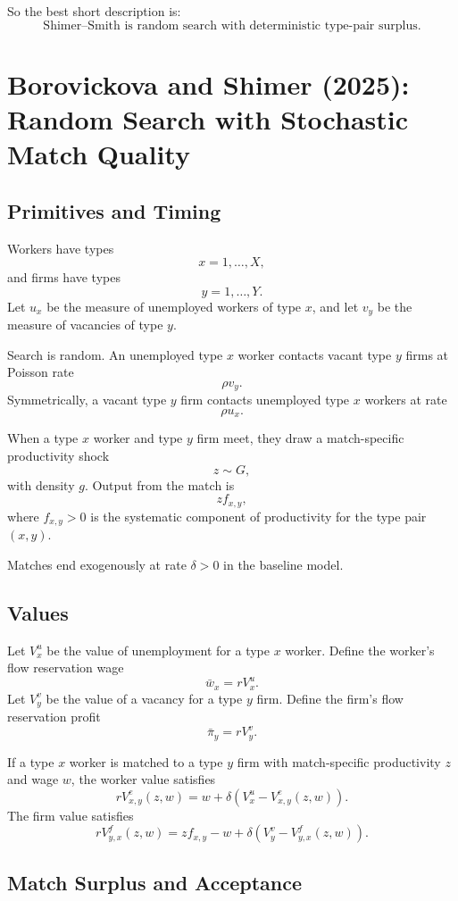 \documentclass[11pt]{article}
\newcommand{\1}{\mathbf{1}}
\begin{document}
So the best short description is:
\[
\boxed{\text{Shimer--Smith is random search with deterministic type-pair surplus.}}
\]

\section{Borovickova and Shimer (2025): Random Search with Stochastic Match Quality}

\subsection{Primitives and Timing}

Workers have types
\[
x=1,\ldots,X,
\]
and firms have types
\[
y=1,\ldots,Y.
\]
Let $u_x$ be the measure of unemployed workers of type $x$, and let $v_y$ be the measure of vacancies of type $y$.

Search is random. An unemployed type $x$ worker contacts vacant type $y$ firms at Poisson rate
\[
\rho v_y.
\]
Symmetrically, a vacant type $y$ firm contacts unemployed type $x$ workers at rate
\[
\rho u_x.
\]

When a type $x$ worker and type $y$ firm meet, they draw a match-specific productivity shock
\[
z \sim G,
\]
with density $g$. Output from the match is
\[
z f_{x,y},
\]
where $f_{x,y}>0$ is the systematic component of productivity for the type pair $(x,y)$.

Matches end exogenously at rate $\delta>0$ in the baseline model.

\subsection{Values}

Let $V_x^u$ be the value of unemployment for a type $x$ worker. Define the worker's flow reservation wage
\[
\bar w_x = rV_x^u.
\]
Let $V_y^v$ be the value of a vacancy for a type $y$ firm. Define the firm's flow reservation profit
\[
\bar \pi_y = rV_y^v.
\]

If a type $x$ worker is matched to a type $y$ firm with match-specific productivity $z$ and wage $w$, the worker value satisfies
\[
rV^e_{x,y}(z,w)
=
w+\delta\left(V_x^u-V^e_{x,y}(z,w)\right).
\]
The firm value satisfies
\[
rV^f_{y,x}(z,w)
=
z f_{x,y}-w+\delta\left(V_y^v-V^f_{y,x}(z,w)\right).
\]

\subsection{Match Surplus and Acceptance}
\end{document}
